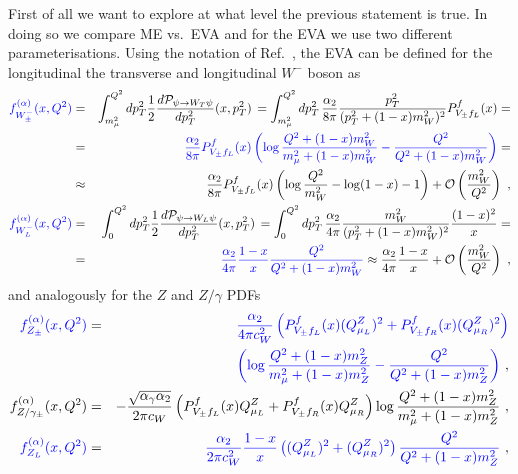 \documentclass[a4paper,11pt]{article}
\begin{document}
First of all we want to explore at what level the previous statement is true. In doing so we compare  ME vs.~EVA and for the EVA we use two different parameterisations. Using the notation of Ref.~\cite{Garosi:2023bvq}, the EVA can be defined for the longitudinal the transverse and longitudinal $W^-$ boson as 
\begin{eqnarray}
   { \color{blue} f_{W^-_\pm}^{(\alpha)}(x, Q^2)} &=& \int_{m_\mu^2}^{Q^2} d p_T^2 \frac{1}{2} \frac{d \mathcal{P}_{\psi \to W_T \psi}}{d p_T^2}(x, p_T^2) \, 
    = \int_{m_\mu^2}^{Q^2} d p_T^2 \, \frac{\alpha_2}{8 \pi} \frac{p_T^2}{(p_T^2 + (1-x) m_W^2)^2} P_{V_\pm f_L}^f(x) = \nonumber \\
    &=& { \color{blue}\frac{\alpha_2}{8 \pi} P_{V_\pm f_L}^f(x) \left( \log \frac{Q^2 + (1-x) m_W^2}{m_{\mu}^2 + (1-x) m_W^2} 
    - \frac{Q^2}{Q^2 + (1-x) m_W^2} \right) }= \nonumber \\
    &\approx& \frac{\alpha_2}{8 \pi} P_{V_\pm f_L}^f(x) \left( \log \frac{Q^2}{m_W^2} - \log(1-x) - 1\right) + \mathcal{O}\left( \frac{m_W^2}{Q^2} \right)~, \label{eq:EWA_WT} \\
%
    {\color{blue} f_{W^-_L}^{(\alpha)}(x, Q^2)} &=& \int_{0}^{Q^2} d p_T^2 \frac{1}{2} \frac{d \mathcal{P}_{\psi \to W_L \psi}}{d p_T^2} (x, p_T^2) \, 
    = \int_{0}^{Q^2} d p_T^2 \, \frac{\alpha_2}{4 \pi} \frac{m_W^2}{(p_T^2 + (1-x) m_W^2)^2} \frac{(1-x)^2}{x} = \nonumber \\
    &=& { \color{blue} \frac{\alpha_2}{4 \pi} \frac{1-x}{x}
    \frac{Q^2}{Q^2 + (1-x) m_W^2}}
    \approx \frac{\alpha_2}{4 \pi} \frac{1-x}{x} + \mathcal{O}\left( \frac{m_W^2}{Q^2} \right) ~,\label{eq:EWA_WL}
\end{eqnarray}
and analogously for the $Z$ and $Z/\gamma$ PDFs
\begin{eqnarray}
    {\color{blue}f_{Z_\pm}^{(\alpha)}(x, Q^2)} &=& 
    {\color{blue}\frac{\alpha_2}{4 \pi c_W^2} \left(P_{V_\pm f_L}^f(x) (Q^Z_{\mu_L})^2 + P_{V_\pm f_R}^f(x) (Q^Z_{\mu_R})^2 \right) }\nonumber \\
    && \quad {\color{blue}\left( \log \frac{Q^2 + (1-x) m_Z^2}{m_{\mu}^2 + (1-x) m_Z^2} 
    - \frac{Q^2}{Q^2 + (1-x) m_Z^2} \right)} ~, \label{eq:EWA_ZT} \\
%
    f_{Z/\gamma_\pm}^{(\alpha)}(x, Q^2) &=& 
    -\frac{\sqrt{\alpha_\gamma \alpha_2}}{2 \pi c_W} \left(P_{V_\pm f_L}^f(x) Q^Z_{\mu_L} + P_{V_\pm f_R}^f(x) Q^Z_{\mu_R} \right) \log \frac{Q^2 + (1-x) m_Z^2}{m_{\mu}^2 + (1-x) m_Z^2}  ~, \label{eq:EWA_ZgaT} \\
%
   {\color{blue} f_{Z_L}^{(\alpha)}(x, Q^2)} &=&
    {\color{blue}\frac{\alpha_2}{2 \pi c_W^2} \frac{1-x}{x} \left( (Q^Z_{\mu_L})^2 + (Q^Z_{\mu_R})^2\right) 
    \frac{Q^2}{Q^2 + (1-x) m_Z^2} }~,\label{eq:EWA_ZL}
\end{eqnarray}
\end{document}
